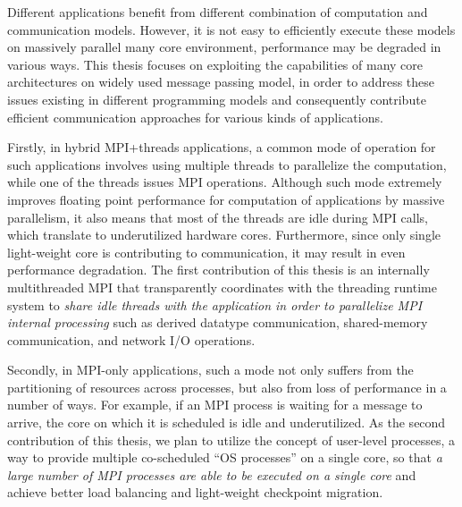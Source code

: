 Different applications benefit from different combination of computation and 
communication models. However, it is not easy to efficiently execute these models
on massively parallel many core environment, performance may be degraded in various
ways. This thesis focuses on exploiting the capabilities of many core architectures
on widely used message passing model, in order to address these issues existing 
in different programming models and consequently contribute efficient communication 
approaches for various kinds of applications. 

Firstly, in hybrid MPI+threads applications, a common mode of operation for such 
applications involves using multiple threads to parallelize the computation, 
while one of the threads issues MPI operations. Although such mode extremely 
improves floating point performance for computation of applications by massive 
parallelism, it also means that most of the threads are idle during MPI calls, 
which translate to underutilized hardware cores. Furthermore, since only single 
light-weight core is contributing to communication, it may result in even 
performance degradation. The first contribution of this thesis is an internally multithreaded 
MPI that transparently coordinates with the threading runtime system to \textit{share
idle threads with the application in order to parallelize MPI internal 
processing} such as derived datatype communication, shared-memory communication, 
and network I/O operations. 

Secondly, in MPI-only applications, such a mode not only suffers from the partitioning 
of resources across processes, but also from loss of performance in a number 
of ways. For example, if an MPI process is waiting for a message to arrive, 
the core on which it is scheduled is idle and underutilized. As the second 
contribution of this thesis, we plan to utilize the concept of user-level 
processes, a way to provide multiple co-scheduled ``OS processes'' on a 
single core, so that \textit{a large number of MPI processes are able 
to be executed on a single core} and achieve better load balancing and 
light-weight checkpoint migration.


